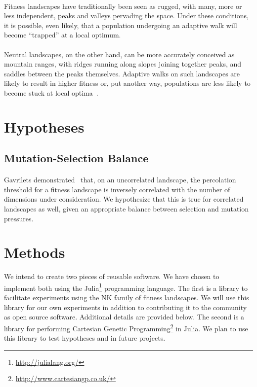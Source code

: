\documentclass[12pt,letterpaper,titlepage,draft]{article}
\begin{document}
\paragraph{}
Fitness landscapes have traditionally been seen as rugged, with many, more or
less independent, peaks and valleys pervading the space. Under these
conditions, it is possible, even likely, that a population undergoing an
adaptive walk will become ``trapped'' at a local optimum.

\paragraph{}
Neutral landscapes, on the other hand, can be more accurately conceived as
mountain ranges, with ridges running along slopes joining together peaks, and
saddles between the peaks themselves. Adaptive walks on such landscapes are
likely to result in higher fitness or, put another way, populations are less
likely to become stuck at local optima~\cite{Newman1998}.

\section{Hypotheses}

\subsection{Mutation-Selection Balance}

\paragraph{}
Gavrilets demonstrated~\cite{Gavrilets1997} that, on an uncorrelated landscape,
the percolation threshold for a fitness landscape is inversely correlated with
the number of dimensions under consideration. We hypothesize that this is true
for correlated landscapes as well, given an appropriate balance between
selection and mutation pressures.

\section{Methods}

\paragraph{}
We intend to create two pieces of reusable software. We have chosen to
implement both using the Julia\footnote{\url{http://julialang.org/}}
programming language. The first is a library to facilitate experiments using
the NK family of fitness landscapes. We will use this library for our own
experiments in addition to contributing it to the community as open source
software. Additional details are provided below. The second is a library for
performing Cartesian Genetic
Programming\footnote{\url{http://www.cartesiangp.co.uk/}} in Julia. We plan to
use this library to test hypotheses and in future projects.
\end{document}
